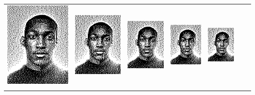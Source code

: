 \begin{tabular}{lllllll}
	\includegraphics{Ediphoto-4-3.png} &
	\includegraphics{Ediphoto-4-4.png} &
	\includegraphics{Ediphoto-4-5.png} &
	\includegraphics{Ediphoto-4-6.png} &
	\includegraphics{Ediphoto-4-7.png} \\
	 &
	 &
	 &
	 &
	 &
	 &
	 \\
\end{tabular}

